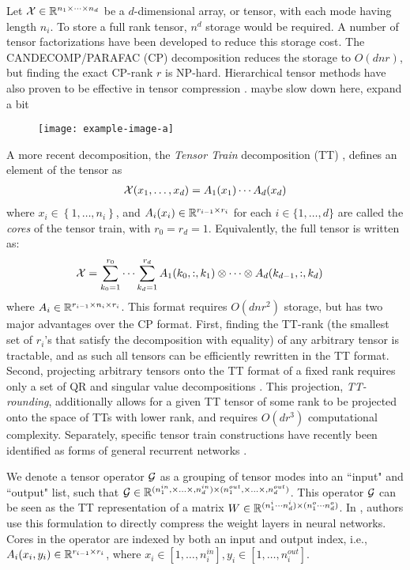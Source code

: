 Let $\mathcal{X} \in \mathbb{R}^{n_1 \times \cdots \times n_d}$ be a $d$-dimensional array, or tensor, with each mode having length $n_i$. To store a full rank tensor, $n^d$ storage would be required. A number of tensor factorizations have been developed to reduce this storage cost. The CANDECOMP/PARAFAC (CP) \cite{harshman1970foundations,carroll1970analysis} decomposition reduces the storage to $O(dnr)$, but finding the exact CP-rank $r$ is NP-hard. Hierarchical tensor methods have also proven to be effective in tensor compression \cite{cohen2016expressive, cohen2016convolutional}. {\color{red} maybe slow down here, expand a bit}

\begin{figure}
	\texttt{[image: example-image-a]}
	\caption[Tensor train decomposition]{\label{Visualization of a tensor train decomposition.}}
\end{figure}
A more recent decomposition, the \textit{Tensor Train} decomposition (TT) \cite{oseledets2011tensor}, defines an element of the tensor as
\begin{align}
\mathcal{X}(x_1,\ldots,x_d) = A_1(x_1)\cdots A_d(x_d)
\end{align}
where $x_i \in \left\{1,\ldots, n_i\right\}$, and $A_i(x_i) \in \mathbb{R}^{r_{i-1} \times r_{i}}$ for each $i \in \{1,\ldots,d\}$ are called the \textit{cores} of the tensor train, with $r_0 = r_d = 1$. Equivalently, the full tensor is written as:
\begin{align}\label{eq:fullTT}
	\mathcal{X} &= \sum_{k_0 = 1}^{r_0} \cdots \sum_{k_d = 1}^{r_d} A_1(k_0,:,k_1) \otimes \cdots \otimes A_d(k_{d-1},:,k_d) 
\end{align}
where $A_i \in \mathbb{R}^{r_{i-1}\times n_i \times r_i} $. This format requires $O(dnr^2)$ storage, but has two major advantages over the CP format. First, finding the TT-rank (the smallest set of $r_i$'s that satisfy the decomposition with equality) of any arbitrary tensor is tractable, and as such all tensors can be efficiently rewritten in the TT format. Second, projecting arbitrary tensors onto the TT format of a fixed rank requires only a set of QR and singular value decompositions \cite{oseledets2011tensor}. This projection, \textit{TT-rounding}, additionally allows for a given TT tensor of some rank to be projected onto the space of TTs with lower rank, and requires $O(dr^3)$ computational complexity. Separately, specific tensor train constructions have recently been identified as forms of general recurrent networks \cite{khrulkov2018generalized}.

We denote a tensor operator $\mathcal{G}$ as a grouping of tensor modes into an ``input" and ``output" list, such that $\mathcal{G} \in \mathbb{R}^{(n_1^{in},\times\ldots\times,n_d^{in}) \times (n_1^{out},\times\ldots\times,n_d^{out})}$. This operator $\mathcal{G}$ can be seen as the TT representation of a matrix $W \in \mathbb{R}^{(n_1^i\cdots n_d^i) \times (n_1^o\cdots n_d^o)}$. In \cite{novikov2015tensorizing}, authors use this formulation to directly compress the weight layers in neural networks. Cores in the operator are indexed by both an input and output index, i.e., $A_i(x_i,y_i) \in \mathbb{R}^{r_{i-1}\times r_i}$, where $x_i \in [1,\ldots,n_i^{in}], y_i \in [1,\ldots,n_i^{out}]$.

